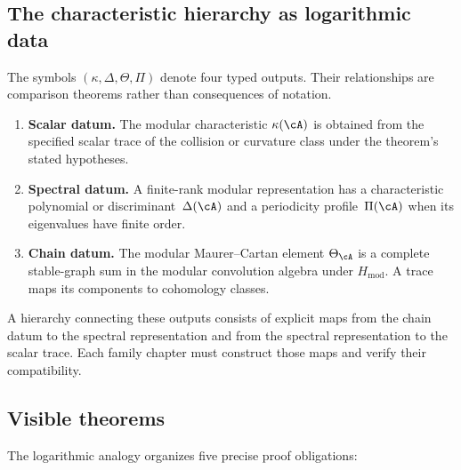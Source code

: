 \subsection{The characteristic hierarchy as logarithmic data}
\label{subsec:characteristic-log}

The symbols $(\kappa,\Delta,\Theta,\Pi)$ denote four typed outputs.
Their relationships are comparison theorems rather than consequences
of notation.

\begin{enumerate}[label=\textbf{Level \arabic*}:, leftmargin=3.5em]
\item \textbf{Scalar datum.}  The modular characteristic
$\kappa(\cA)$ is obtained from the specified scalar trace of the
collision or curvature class under the theorem's stated hypotheses.

\item \textbf{Spectral datum.}  A finite-rank modular representation
has a characteristic polynomial or discriminant~$\Delta(\cA)$ and a
periodicity profile~$\Pi(\cA)$ when its eigenvalues have finite order.

\item \textbf{Chain datum.}  The modular Maurer--Cartan element
$\Theta_\cA$ is a complete stable-graph sum in the modular convolution
algebra under $H_{\mathrm{mod}}$.  A trace maps its components to
cohomology classes.
\end{enumerate}

\noindent
A hierarchy connecting these outputs consists of explicit maps from
the chain datum to the spectral representation and from the spectral
representation to the scalar trace.  Each family chapter must
construct those maps and verify their compatibility.

\subsection{Visible theorems}
\label{subsec:visible-theorems-log}

The logarithmic analogy organizes five precise proof obligations:

